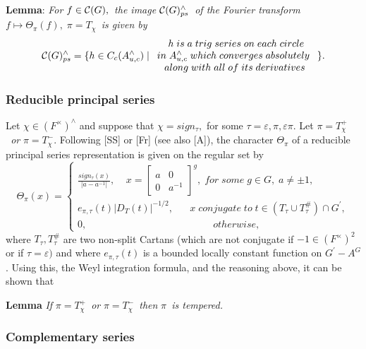 {\bf Lemma}: {\em For }$f\in {\cal C}(G),${\em \ the image }${\cal C}%
(G)_{ps}^{\wedge }${\em \ of the Fourier transform }$f\longmapsto \Theta
_\pi (f),\;\pi =T_\chi ${\em \ is given by} 
\[
{\cal C}(G)_{ps}^{\wedge }=\{h\in C_c(A_{u,c}^{\wedge })\;|\; 
\begin{array}{c}
\;h\;is\;a\;trig\;series\;on\;each\;circle \\ 
in\;A_{u,c}^{\wedge }\;which\;converges\;absolutely\; \\ 
along\;with\;all\;of\;its\;derivatives
\end{array}
\}. 
\]

\subsubsection{Reducible principal series}

Let $\chi \in (F^{\times })^{\wedge }$ and suppose that $\chi =sign_\tau ,$
for some $\tau =\varepsilon ,\pi ,\varepsilon \pi .$ Let $\pi =T_\chi ^{+}$%
{\em \ or }$\pi =T_\chi ^{-}$. Following [SS] or [Fr] (see also [A]), the
character $\Theta _\pi $ of a reducible principal series representation is
given on the regular set by 
\[
\Theta _\pi (x)=\left\{ 
\begin{array}{c}
\frac{sign_\tau (x)}{|a-a^{-1}|},\;\;\;\;x=\left[ 
\begin{array}{cc}
a & 0 \\ 
0 & a^{-1}
\end{array}
\right] ^g,\;for\;some\;g\in G,\;a\neq \pm 1,\; \\ 
e_{\pi ,\tau }(t)|D_T(t)|^{-1/2},\;\;\;\;\;\;x\;conjugate\;to\;t\in (T_\tau
\cup T_\tau ^{\#})\cap G^{\prime }, \\ 
0,\;\;\;\;\;\;\;\;\;\;\;\;\;\;\;\;\;\;\;\;\;\;\;\;\;\;\;\;\;\;\;\;\;\;\;\;\;%
\;\;\;\;\;\;\;\;\;otherwise,
\end{array}
\right. 
\]
where $T_\tau ,T_\tau ^{\#}$ are two non-split Cartans (which are not
conjugate if $-1\in (F^{\times })^2$ or if $\tau =\varepsilon )$ and where $%
e_{\pi ,\tau }(t)$ is a bounded locally constant function on $G^{\prime
}-A^G $. Using this, the Weyl integration formula, and the reasoning above,
it can be shown that

{\bf Lemma} {\em If }$\pi =T_\chi ^{+}${\em \ or }$\pi =T_\chi ^{-}${\em \
then }$\pi ${\em \ is tempered.}

\subsubsection{Complementary series}

